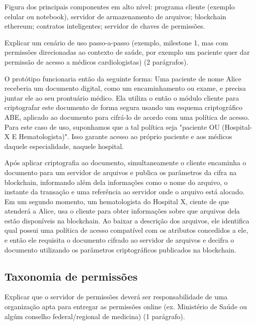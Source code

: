 \documentclass[a4paper,11pt]{article}
\begin{document}
{\color{ForestGreen}Figura dos principais componentes em alto nível: programa cliente (exemplo celular ou notebook), servidor de armazenamento de arquivos; blockchain ethereum; contratos inteligentes; servidor de chaves de permissões.}

{\color{ForestGreen}Explicar um cenário de uso passo-a-passo (exemplo, milestone 1, mas com permissões direcionadas ao contexto de saúde, por exemplo um paciente quer dar permissão de acesso a médicos cardiologistas) (2 parágrafos)}.

O protótipo funcionaria então da seguinte forma: Uma paciente de nome Alice receberia um documento digital, como um encaminhamento ou exame, e precisa juntar ele ao seu prontuário médico. Ela utiliza o então o módulo cliente para criptografar este documento de forma segura usando um esquema criptográfico ABE, aplicado ao documento para cifrá-lo de acordo com uma política de acesso. Para este caso de uso, suponhamos que a tal política seja "paciente OU (Hospital-X E Hematologista)". Isso garante acesso ao próprio paciente e aos médicos daquele especialidade, naquele hospital.

Após aplicar criptografia ao documento, simultaneamente o cliente encaminha o documento para um servidor de arquivos e publica os parâmetros da cifra na blockchain, informando além dela informações como o nome do arquivo, o instante da transação e uma referência ao servidor onde o arquivo está alocado. Em um segundo momento, um hematologista do Hospital X, ciente de que atenderá a Alice, usa o cliente para obter informações sobre que arquivos dela estão disponíveis na blockchain. Ao baixar a descrição dos arquivos, ele identifica qual possui uma política de acesso compatível com os atributos concedidos a ele, e então ele requisita o documento cifrado ao servidor de arquivos e decifra o documento utilizando os parâmetros criptográficos publicados na blockchain.

\subsection{Taxonomia de permissões}

{\color{ForestGreen}Explicar que o servidor de permissões deverá ser responsabilidade de uma organização apta para entregar as permissões online (ex. Ministério de Saúde ou algúm conselho federal/regional de medicina) (1 parágrafo)}.
\end{document}
